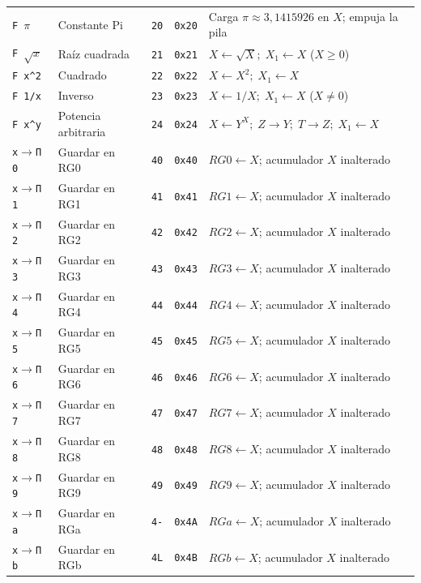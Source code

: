 \documentclass[11pt,a4paper]{article}
\begin{document}
{\begin{longtable}{p{2.2cm}p{3.0cm}>{\centering\arraybackslash}p{1.0cm}>{\centering\arraybackslash}p{1.2cm}p{7.3cm}}
\midrule
\texttt{F $\pi$} & Constante Pi & \texttt{20} & \texttt{0x20} & Carga $\pi \approx 3{,}1415926$ en $X$; empuja la pila \\
\texttt{F $\sqrt{x}$} & Raíz cuadrada & \texttt{21} & \texttt{0x21} & $X \leftarrow \sqrt{X};\; X_1 \leftarrow X$ ($X \ge 0$) \\
\texttt{F x\textasciicircum 2} & Cuadrado & \texttt{22} & \texttt{0x22} & $X \leftarrow X^2;\; X_1 \leftarrow X$ \\
\texttt{F 1/x} & Inverso & \texttt{23} & \texttt{0x23} & $X \leftarrow 1/X;\; X_1 \leftarrow X$ ($X \ne 0$) \\
\texttt{F x\textasciicircum y} & Potencia arbitraria & \texttt{24} & \texttt{0x24} & $X \leftarrow Y^X;\; Z \to Y;\; T \to Z;\; X_1 \leftarrow X$ \\
\midrule
\texttt{x$\to$П 0} & Guardar en RG0 & \texttt{40} & \texttt{0x40} & $RG0 \leftarrow X$; acumulador $X$ inalterado \\
\texttt{x$\to$П 1} & Guardar en RG1 & \texttt{41} & \texttt{0x41} & $RG1 \leftarrow X$; acumulador $X$ inalterado \\
\texttt{x$\to$П 2} & Guardar en RG2 & \texttt{42} & \texttt{0x42} & $RG2 \leftarrow X$; acumulador $X$ inalterado \\
\texttt{x$\to$П 3} & Guardar en RG3 & \texttt{43} & \texttt{0x43} & $RG3 \leftarrow X$; acumulador $X$ inalterado \\
\texttt{x$\to$П 4} & Guardar en RG4 & \texttt{44} & \texttt{0x44} & $RG4 \leftarrow X$; acumulador $X$ inalterado \\
\texttt{x$\to$П 5} & Guardar en RG5 & \texttt{45} & \texttt{0x45} & $RG5 \leftarrow X$; acumulador $X$ inalterado \\
\texttt{x$\to$П 6} & Guardar en RG6 & \texttt{46} & \texttt{0x46} & $RG6 \leftarrow X$; acumulador $X$ inalterado \\
\texttt{x$\to$П 7} & Guardar en RG7 & \texttt{47} & \texttt{0x47} & $RG7 \leftarrow X$; acumulador $X$ inalterado \\
\texttt{x$\to$П 8} & Guardar en RG8 & \texttt{48} & \texttt{0x48} & $RG8 \leftarrow X$; acumulador $X$ inalterado \\
\texttt{x$\to$П 9} & Guardar en RG9 & \texttt{49} & \texttt{0x49} & $RG9 \leftarrow X$; acumulador $X$ inalterado \\
\texttt{x$\to$П a} & Guardar en RGa & \texttt{4-} & \texttt{0x4A} & $RGa \leftarrow X$; acumulador $X$ inalterado \\
\texttt{x$\to$П b} & Guardar en RGb & \texttt{4L} & \texttt{0x4B} & $RGb \leftarrow X$; acumulador $X$ inalterado \\

\end{longtable}}
\end{document}
